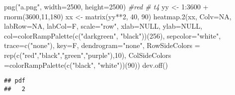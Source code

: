 \documentclass[
]{article}
\newenvironment{Shaded}{\begin{snugshade}}{\end{snugshade}}
\newcommand{\AttributeTok}[1]{\textcolor[rgb]{0.77,0.63,0.00}{#1}}
\newcommand{\CommentTok}[1]{\textcolor[rgb]{0.56,0.35,0.01}{\textit{#1}}}
\newcommand{\ConstantTok}[1]{\textcolor[rgb]{0.00,0.00,0.00}{#1}}
\newcommand{\DecValTok}[1]{\textcolor[rgb]{0.00,0.00,0.81}{#1}}
\newcommand{\FunctionTok}[1]{\textcolor[rgb]{0.00,0.00,0.00}{#1}}
\newcommand{\NormalTok}[1]{#1}
\newcommand{\OtherTok}[1]{\textcolor[rgb]{0.56,0.35,0.01}{#1}}
\newcommand{\SpecialCharTok}[1]{\textcolor[rgb]{0.00,0.00,0.00}{#1}}
\newcommand{\StringTok}[1]{\textcolor[rgb]{0.31,0.60,0.02}{#1}}
\begin{document}
\begin{Shaded}
\begin{Highlighting}[]
\FunctionTok{png}\NormalTok{(}\StringTok{"a.png"}\NormalTok{, }\AttributeTok{width=}\DecValTok{2500}\NormalTok{, }\AttributeTok{height=}\DecValTok{2500}\NormalTok{) }\CommentTok{\#red \# t4}
\NormalTok{yy }\OtherTok{\textless{}{-}} \DecValTok{1}\SpecialCharTok{:}\DecValTok{3600} \SpecialCharTok{+} \FunctionTok{rnorm}\NormalTok{(}\DecValTok{3600}\NormalTok{,}\DecValTok{11}\NormalTok{,}\DecValTok{180}\NormalTok{)}
\NormalTok{xx }\OtherTok{\textless{}{-}} \FunctionTok{matrix}\NormalTok{(yy}\SpecialCharTok{**}\DecValTok{2}\NormalTok{, }\DecValTok{40}\NormalTok{, }\DecValTok{90}\NormalTok{)}
\FunctionTok{heatmap.2}\NormalTok{(xx, }\AttributeTok{Colv=}\ConstantTok{NA}\NormalTok{, }\AttributeTok{labRow=}\ConstantTok{NA}\NormalTok{, }\AttributeTok{labCol=}\NormalTok{F, }\AttributeTok{scale=}\StringTok{"row"}\NormalTok{, }\AttributeTok{xlab=}\ConstantTok{NULL}\NormalTok{,}
          \AttributeTok{ylab=}\ConstantTok{NULL}\NormalTok{, }\AttributeTok{col=}\FunctionTok{colorRampPalette}\NormalTok{(}\FunctionTok{c}\NormalTok{(}\StringTok{"darkgreen"}\NormalTok{, }\StringTok{"black"}\NormalTok{))(}\DecValTok{256}\NormalTok{),  }
        \AttributeTok{sepcolor=}\StringTok{"white"}\NormalTok{, }\AttributeTok{trace=}\FunctionTok{c}\NormalTok{(}\StringTok{"none"}\NormalTok{), }\AttributeTok{key=}\NormalTok{F, }\AttributeTok{dendrogram=}\StringTok{"none"}\NormalTok{,}
        \AttributeTok{RowSideColors =} \FunctionTok{rep}\NormalTok{(}\FunctionTok{c}\NormalTok{(}\StringTok{"red"}\NormalTok{,}\StringTok{"black"}\NormalTok{,}\StringTok{"green"}\NormalTok{,}\StringTok{"purple"}\NormalTok{),}\DecValTok{10}\NormalTok{),}
        \AttributeTok{ColSideColors =}\FunctionTok{colorRampPalette}\NormalTok{(}\FunctionTok{c}\NormalTok{(}\StringTok{"black"}\NormalTok{, }\StringTok{"white"}\NormalTok{))(}\DecValTok{90}\NormalTok{))}
\FunctionTok{dev.off}\NormalTok{()}
\end{Highlighting}
\end{Shaded}

\begin{verbatim}
## pdf 
##   2
\end{verbatim}
\end{document}
